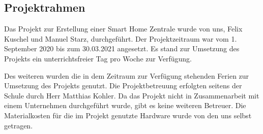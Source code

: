\subsection{Projektrahmen}\label{vw_projektrahmen}
Das Projekt zur Erstellung einer Smart Home Zentrale wurde von uns, Felix Kuschel und Manuel Starz, durchgeführt.
Der Projektzeitraum war vom 1. September 2020 bis zum 30.03.2021 angesetzt. Es stand zur Umsetzung des Projekts ein unterrichtsfreier Tag pro Woche zur Verfügung.\par
\noindent Des weiteren wurden die in dem Zeitraum zur Verfügung stehenden Ferien zur Umsetzung des Projekts genutzt. 
Die Projektbetreuung erfolgten seitens der Schule durch Herr Matthias Kohler.
Da das Projekt nicht in Zusammenarbeit mit einem Unternehmen durchgeführt wurde, gibt es keine weiteren Betreuer.
Die Materialkosten für die im Projekt genutzte Hardware wurde von den uns selbst getragen.